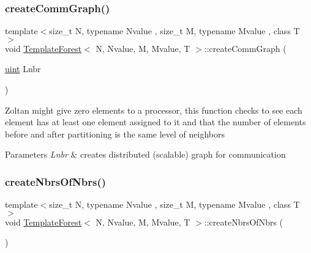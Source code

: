 \mbox{\label{classTemplateForest_a5816e439571082d5a109ff626730159d}} 
\subsubsection{\texorpdfstring{create\+Comm\+Graph()}{createCommGraph()}}
{\footnotesize\ttfamily template$<$size\+\_\+t N, typename Nvalue , size\+\_\+t M, typename Mvalue , class T $>$ \\
void \mbox{\hyperlink{classTemplateForest}{Template\+Forest}}$<$ N, Nvalue, M, Mvalue, T $>$\+::create\+Comm\+Graph (\begin{DoxyParamCaption}\item[{\mbox{\hyperlink{definitions_8h_a69aa29b598b851b0640aa225a9e5d61d}{uint}}}]{Lnbr }\end{DoxyParamCaption})}

Zoltan might give zero elements to a processor, this function checks to see each element has at least one element assigned to it and that the number of elements before and after partitioning is the same level of neighbors 
\begin{DoxyParams}{Parameters}
{\em Lnbr} & creates distributed (scalable) graph for communication \\
\hline
\end{DoxyParams}
\mbox{\label{classTemplateForest_a0f899811a6c9edda8c8aa807393dd0bf}} 
\subsubsection{\texorpdfstring{create\+Nbrs\+Of\+Nbrs()}{createNbrsOfNbrs()}}
{\footnotesize\ttfamily template$<$size\+\_\+t N, typename Nvalue , size\+\_\+t M, typename Mvalue , class T $>$ \\
void \mbox{\hyperlink{classTemplateForest}{Template\+Forest}}$<$ N, Nvalue, M, Mvalue, T $>$\+::create\+Nbrs\+Of\+Nbrs (\begin{DoxyParamCaption}{ }\end{DoxyParamCaption})}

\mbox{\label{classTemplateForest_a46d583a9f00ec3b0caf2067589a0ef8a}} 
